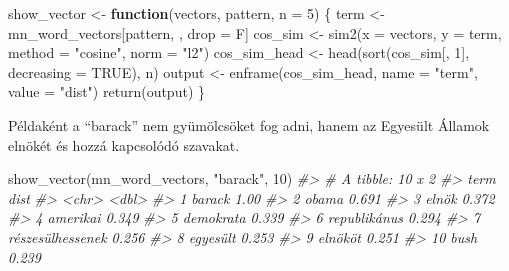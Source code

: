 \documentclass[
]{book}
\newenvironment{Shaded}{\begin{snugshade}}{\end{snugshade}}
\newcommand{\AttributeTok}[1]{\textcolor[rgb]{0.77,0.63,0.00}{#1}}
\newcommand{\CommentTok}[1]{\textcolor[rgb]{0.56,0.35,0.01}{\textit{#1}}}
\newcommand{\ConstantTok}[1]{\textcolor[rgb]{0.00,0.00,0.00}{#1}}
\newcommand{\ControlFlowTok}[1]{\textcolor[rgb]{0.13,0.29,0.53}{\textbf{#1}}}
\newcommand{\DecValTok}[1]{\textcolor[rgb]{0.00,0.00,0.81}{#1}}
\newcommand{\FunctionTok}[1]{\textcolor[rgb]{0.00,0.00,0.00}{#1}}
\newcommand{\NormalTok}[1]{#1}
\newcommand{\OtherTok}[1]{\textcolor[rgb]{0.56,0.35,0.01}{#1}}
\newcommand{\StringTok}[1]{\textcolor[rgb]{0.31,0.60,0.02}{#1}}
\begin{document}
\begin{Shaded}
\begin{Highlighting}[]
\NormalTok{show\_vector }\OtherTok{\textless{}{-}} \ControlFlowTok{function}\NormalTok{(vectors, pattern, }\AttributeTok{n =} \DecValTok{5}\NormalTok{) \{}
\NormalTok{  term }\OtherTok{\textless{}{-}}\NormalTok{ mn\_word\_vectors[pattern, , drop }\OtherTok{=}\NormalTok{ F]}
\NormalTok{  cos\_sim }\OtherTok{\textless{}{-}} \FunctionTok{sim2}\NormalTok{(}\AttributeTok{x =}\NormalTok{ vectors, }\AttributeTok{y =}\NormalTok{ term, }\AttributeTok{method =} \StringTok{"cosine"}\NormalTok{, }\AttributeTok{norm =} \StringTok{"l2"}\NormalTok{)}
\NormalTok{  cos\_sim\_head }\OtherTok{\textless{}{-}} \FunctionTok{head}\NormalTok{(}\FunctionTok{sort}\NormalTok{(cos\_sim[, }\DecValTok{1}\NormalTok{], }\AttributeTok{decreasing =} \ConstantTok{TRUE}\NormalTok{), n)}
\NormalTok{  output }\OtherTok{\textless{}{-}} \FunctionTok{enframe}\NormalTok{(cos\_sim\_head, }\AttributeTok{name =} \StringTok{"term"}\NormalTok{, }\AttributeTok{value =} \StringTok{"dist"}\NormalTok{)}
  \FunctionTok{return}\NormalTok{(output)}
\NormalTok{\}}
\end{Highlighting}
\end{Shaded}

Példaként a ``barack'' nem gyümölcsöket fog adni, hanem az Egyesült
Államok elnökét és hozzá kapcsolódó szavakat.

\begin{Shaded}
\begin{Highlighting}[]
\FunctionTok{show\_vector}\NormalTok{(mn\_word\_vectors, }\StringTok{"barack"}\NormalTok{, }\DecValTok{10}\NormalTok{)}
\CommentTok{\#\textgreater{} \# A tibble: 10 x 2}
\CommentTok{\#\textgreater{}    term              dist}
\CommentTok{\#\textgreater{}    \textless{}chr\textgreater{}            \textless{}dbl\textgreater{}}
\CommentTok{\#\textgreater{}  1 barack           1.00 }
\CommentTok{\#\textgreater{}  2 obama            0.691}
\CommentTok{\#\textgreater{}  3 elnök            0.372}
\CommentTok{\#\textgreater{}  4 amerikai         0.349}
\CommentTok{\#\textgreater{}  5 demokrata        0.339}
\CommentTok{\#\textgreater{}  6 republikánus     0.294}
\CommentTok{\#\textgreater{}  7 részesülhessenek 0.256}
\CommentTok{\#\textgreater{}  8 egyesült         0.253}
\CommentTok{\#\textgreater{}  9 elnököt          0.251}
\CommentTok{\#\textgreater{} 10 bush             0.239}
\end{Highlighting}
\end{Shaded}
\end{document}
